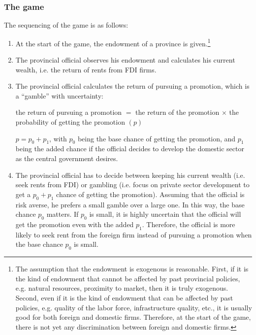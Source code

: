 \subsubsection{The game}

The sequencing of the game is as follows:
\begin{enumerate}
\item At the start of the game, the endowment of a province is given.\footnote{The assumption that the endowment is exogenous is reasonable. First, if it is the kind of endowment that cannot be affected by past provincial policies, e.g. natural resources, proximity to market, then it is truly exogenous. Second, even if it is the kind of endowment that can be affected by past policies, e.g. quality of the labor force, infrastructure quality, etc., it is usually good for both foreign and domestic firms. Therefore, at the start of the game, there is not yet any discrimination between foreign and domestic firms.}
\item The provincial official observes his endowment and calculates his current wealth, i.e. the return of rents from FDI firms.
\item The provincial official calculates the return of pursuing a promotion, which is a ``gamble'' with uncertainty:

the return of pursuing a promotion $=$ the return of the promotion $\times$ the probability of getting the promotion $(p)$

$p = p_0 + p_1$, with $p_0$ being the base chance of getting the promotion, and $p_1$ being the added chance if the official decides to develop the domestic sector as the central government desires.

\item The provincial official has to decide between keeping his current wealth (i.e. seek rents from FDI) or gambling (i.e. focus on private sector development to get a $p_0 + p_1$ chance of getting the promotion). Assuming that the official is risk averse, he prefers a small gamble over a large one. In this way, the base chance $p_0$ matters. If $p_0$ is small, it is highly uncertain that the official will get the promotion even with the added $p_1$. Therefore, the official is more likely to seek rent from the foreign firm instead of pursuing a promotion when the base chance $p_0$ is small. 
\end{enumerate}

